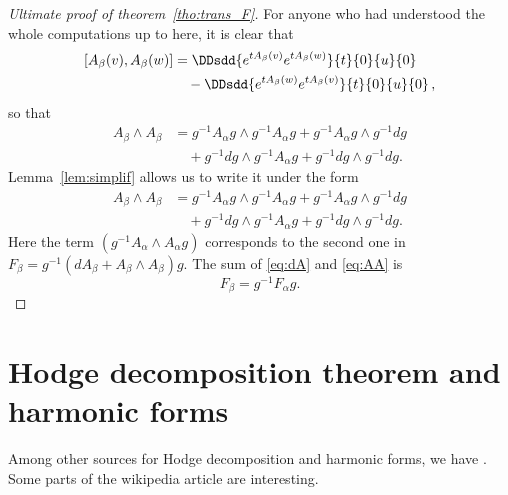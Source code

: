 \begin{proof}[Ultimate proof of theorem~\ref{tho:trans_F}]
For anyone who had understood the whole computations up to here, it is clear that
\begin{equation}
\begin{split}
     [A_{\beta}(v),A_{\beta}(w)]&=\DDsdd{ e^{tA_{\beta}(v)}e^{tA_{\beta}(w)} }{t}{0}{u}{0}\\
                            &\quad-\DDsdd{ e^{tA_{\beta}(w)}e^{tA_{\beta}(v)} }{t}{0}{u}{0}\,,
\end{split}
\end{equation}
so that
\begin{equation}
\begin{split}
  A_{\beta}\wedge A_{\beta}&=g^{-1} A_{\alpha} g\wedge g^{-1} A_{\alpha} g
                         +g^{-1} A_{\alpha} g\wedge g^{-1} dg\\
		       &\quad+g^{-1} dg\wedge g^{-1} A_{\alpha} g
		       +g^{-1} dg\wedge g^{-1} dg.
\end{split}
\end{equation}
Lemma~\ref{lem:simplif} allows us to write it under the form
\begin{equation}\label{eq:AA}
\begin{split}
  A_{\beta}\wedge A_{\beta}&=g^{-1} A_{\alpha} g\wedge g^{-1} A_{\alpha} g
                         +g^{-1} A_{\alpha} g\wedge g^{-1} dg\\
		       &\quad+g^{-1} dg\wedge g^{-1} A_{\alpha} g
		       +g^{-1} dg\wedge g^{-1} dg.
\end{split}
\end{equation}
Here the term $(g^{-1} A_{\alpha}\wedge A_{\alpha} g)$ corresponds to the second one in $F_{\beta}=g^{-1}(dA_{\beta}+A_{\beta}\wedge A_{\beta})g$. The sum of \eqref{eq:dA} and \eqref{eq:AA} is
\[
    F_{\beta}=g^{-1} F_{\alpha} g.
\]
\end{proof}

\section{Hodge decomposition theorem and harmonic forms}

Among other sources for Hodge decomposition and harmonic forms, we have \cite{JohnsonHodge,CohoHarBound,UndergradDeRham}. Some parts of the wikipedia article  are interesting.

